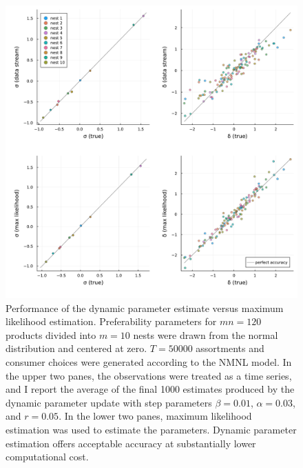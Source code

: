 \documentclass[preprint,12pt,authoryear]{elsarticle}
\begin{document}
\begin{figure}
\begin{center}\includegraphics[width=\linewidth, ]{../plots/param-est-dynamic-nested-as-static.pdf}\end{center}
\captionsetup{singlelinecheck=off}
    \caption[.]{Performance of the dynamic parameter estimate versus maximum likelihood estimation. Preferability parameters for $mn = 120$ products divided into $m=10$ nests were drawn from the normal distribution and centered at zero. $T=50000$ assortments and consumer choices were generated according to the NMNL model. In the upper two panes, the observations were treated as a time series, and I report the average of the final 1000 estimates produced by the dynamic parameter update with step parameters $\beta = 0.01$, $\alpha = 0.03$, and $r = 0.05$. In the lower two panes, maximum likelihood estimation was used to estimate the parameters. Dynamic parameter estimation offers acceptable accuracy at substantially lower computational cost.}
\label{param-est-dynamic-nested-as-static}
\end{figure}
\end{document}
